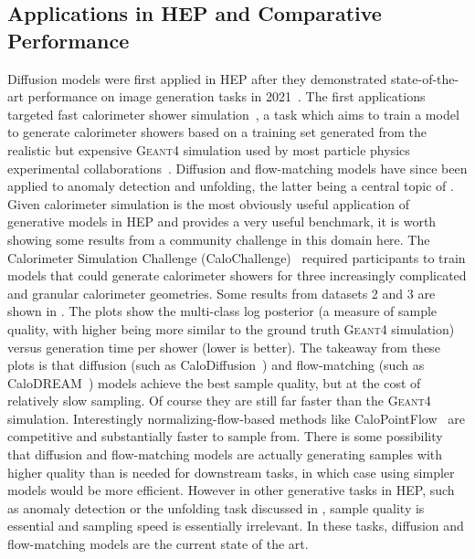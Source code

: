\subsection{Applications in HEP and Comparative Performance}
\label{sec:diffusion_hep}

Diffusion models were first applied in HEP after they demonstrated state-of-the-art performance on image generation tasks in 2021~\cite{Ho:2020ddpm,Song:2021score}.
The first applications targeted fast calorimeter shower simulation~\cite{Mikuni:2022xry,Amram:2023onf}, a task which aims to train a model to generate calorimeter showers based on a training set generated from the realistic but expensive \textsc{Geant4} simulation used by most particle physics experimental collaborations~\cite{GEANT4:2002zbu}.
Diffusion and flow-matching models have since been applied to anomaly detection and unfolding, the latter being a central topic of .
Given calorimeter simulation is the most obviously useful application of generative models in HEP and provides a very useful benchmark, it is worth showing some results from a community challenge in this domain here.
The Calorimeter Simulation Challenge (CaloChallenge)~\cite{Krause:2024avx} required participants to train models that could generate calorimeter showers for three increasingly complicated and granular calorimeter geometries.
Some results from datasets 2 and 3 are shown in .
The plots show the multi-class log posterior (a measure of sample quality, with higher being more similar to the ground truth \textsc{Geant4} simulation) versus generation time per shower (lower is better).
The takeaway from these plots is that diffusion (such as CaloDiffusion~\cite{Amram:2023onf}) and flow-matching (such as CaloDREAM~\cite{Favaro:2024rle}) models achieve the best sample quality, but at the cost of relatively slow sampling.
Of course they are still far faster than the \textsc{Geant4} simulation.
Interestingly normalizing-flow-based methods like CaloPointFlow~\cite{Schnake:2024mip} are competitive and substantially faster to sample from.
There is some possibility that diffusion and flow-matching models are actually generating samples with higher quality than is needed for downstream tasks, in which case using simpler models would be more efficient.
However in other generative tasks in HEP, such as anomaly detection or the unfolding task discussed in , sample quality is essential and sampling speed is essentially irrelevant.
In these tasks, diffusion and flow-matching models are the current state of the art.

